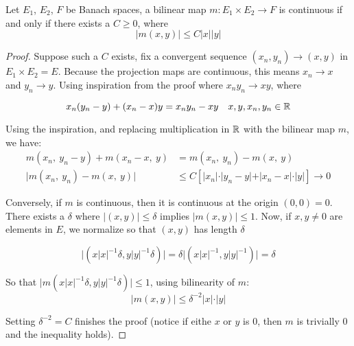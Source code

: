 \documentclass[../main-manifolds.tex]{subfiles}
\begin{document}
\begin{wts}\label{prop:characterization-of-continuity-bilinear-map}
    Let $E_1$, $E_2$, $F$ be Banach spaces, a bilinear map $m: E_1\times E_2\to F$ is continuous if and only if there exists a $C\geq 0$, where
    \begin{equation}\label{eq:continuity-bilinear-map}
        \vert m(x,y)\vert\leq C\vert x\vert\vert y\vert    
    \end{equation}
\end{wts}
\begin{proof}
    Suppose such a $C$ exists, fix a convergent sequence $(x_n, y_n)\to (x,y)$ in $E_1\times E_2 = E$. Because the projection maps are continuous, this means $x_n\to x$ and $y_n\to y$. Using inspiration from the proof where $x_ny_n\to xy$, where

    \[
        x_n(y_n-y) + (x_n-x)y = x_ny_n- xy\quad x,y,x_n,y_n\in\mathbb{R}
    \]

    Using the inspiration, and replacing multiplication in $\mathbb{R}$ with the bilinear map $m$, we have:
    \begin{align*}
        m(x_n,\: y_n-y) + m(x_n-x,\: y) &= m(x_n,\:y_n) - m(x,\:y)\\
        \vert m(x_n,\: y_n) - m(x,\: y)\vert &\leq C[\vert x_n\vert\cdot\vert y_n - y\vert + \vert x_n - x\vert\cdot\vert y\vert]\to 0
    \end{align*}

    Conversely, if $m$ is continuous, then it is continuous at the origin $(0,0)=0$. There exists a $\delta$ where $\vert (x,y)\vert \leq \delta$ implies $\vert m(x,y)\vert \leq 1$. Now, if $x,y\neq 0$ are elements in $E$, we normalize so that $(x,y)$ has length $\delta$

    \[
        \vert(x\vert x\vert^{-1}\delta,y\vert y\vert^{-1}\delta)\vert = \delta\vert(x\vert x\vert^{-1},y\vert y\vert^{-1})\vert = \delta
    \]

    So that $\vert m(x\vert x\vert^{-1}\delta, y\vert y\vert^{-1}\delta)\vert \leq 1$, using bilinearity of $m$:
    \[
        \vert m(x,y)\vert\leq \delta^{-2}\vert x\vert\cdot\vert y\vert
    \]

    Setting $\delta^{-2} = C$ finishes the proof (notice if eithe $x$ or $y$ is $0$, then $m$ is trivially $0$ and the inequality holds).
\end{proof}
\end{document}
